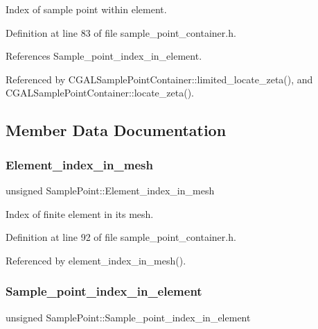 Index of sample point within element. 



Definition at line 83 of file sample\+\_\+point\+\_\+container.\+h.



References Sample\+\_\+point\+\_\+index\+\_\+in\+\_\+element.



Referenced by C\+G\+A\+L\+Sample\+Point\+Container\+::limited\+\_\+locate\+\_\+zeta(), and C\+G\+A\+L\+Sample\+Point\+Container\+::locate\+\_\+zeta().



\subsection{Member Data Documentation}
\mbox{\label{classSamplePoint_ac2fcd449feb15e9fdf348b946b60ae37}} 
\subsubsection{\texorpdfstring{Element\+\_\+index\+\_\+in\+\_\+mesh}{Element\_index\_in\_mesh}}
{\footnotesize\ttfamily unsigned Sample\+Point\+::\+Element\+\_\+index\+\_\+in\+\_\+mesh\hspace{0.3cm}{\ttfamily [private]}}



Index of finite element in its mesh. 



Definition at line 92 of file sample\+\_\+point\+\_\+container.\+h.



Referenced by element\+\_\+index\+\_\+in\+\_\+mesh().

\mbox{\label{classSamplePoint_a7901c8c1880e5a7ff4e03507dce3b728}} 
\subsubsection{\texorpdfstring{Sample\+\_\+point\+\_\+index\+\_\+in\+\_\+element}{Sample\_point\_index\_in\_element}}
{\footnotesize\ttfamily unsigned Sample\+Point\+::\+Sample\+\_\+point\+\_\+index\+\_\+in\+\_\+element\hspace{0.3cm}{\ttfamily [private]}}



